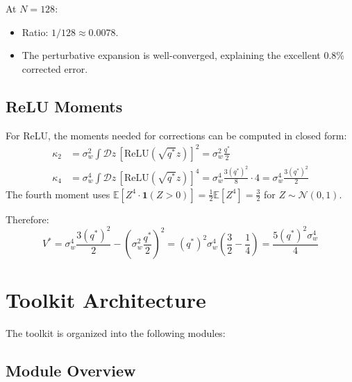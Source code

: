 \documentclass[10pt]{article}
\newcommand{\EE}{\mathbb{E}}
\begin{document}
At $N = 128$:
\begin{itemize}[nosep]
    \item Ratio: $1/128 \approx 0.0078$.
    \item The perturbative expansion is well-converged, explaining the excellent 0.8\% corrected error.
\end{itemize}

\subsection{ReLU Moments}

For ReLU, the moments needed for corrections can be computed in closed form:
\begin{align}
    \kappa_2 &= \sigma_w^2 \int \mathcal{D}z\, [\text{ReLU}(\sqrt{q^*}z)]^2 = \sigma_w^2 \frac{q^*}{2} \\
    \kappa_4 &= \sigma_w^4 \int \mathcal{D}z\, [\text{ReLU}(\sqrt{q^*}z)]^4 = \sigma_w^4 \frac{3(q^*)^2}{8} \cdot 4 = \sigma_w^4 \frac{3(q^*)^2}{2}
\end{align}
The fourth moment uses $\EE[Z^4 \cdot \mathbf{1}(Z>0)] = \frac{1}{2}\EE[Z^4] = \frac{3}{2}$ for $Z \sim \mathcal{N}(0,1)$.

Therefore:
\begin{equation}
    V^* = \sigma_w^4 \frac{3(q^*)^2}{2} - \left(\sigma_w^2 \frac{q^*}{2}\right)^2 = (q^*)^2 \sigma_w^4 \left(\frac{3}{2} - \frac{1}{4}\right) = \frac{5(q^*)^2 \sigma_w^4}{4}
\end{equation}


\section{Toolkit Architecture}
\label{app:architecture}

The toolkit is organized into the following modules:

\subsection{Module Overview}
\end{document}
